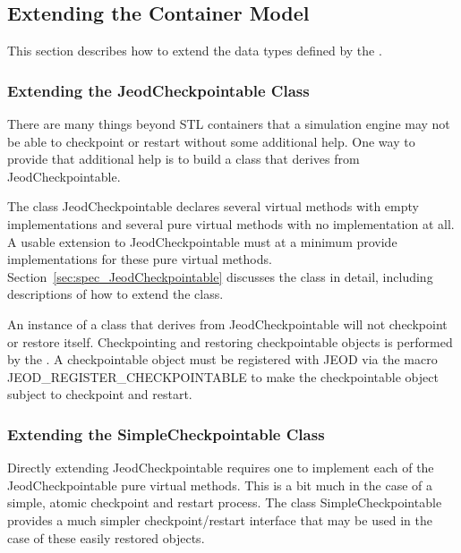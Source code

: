 \subsection{Extending the Container Model}
This section describes how to extend the data types defined by the
\ModelDesc.


\subsubsection{Extending the JeodCheckpointable Class}
\label{sec:guide_JeodCheckpointable}
There are many things beyond STL containers that a simulation engine may not
be able to checkpoint or restart without some additional help. One way
to provide that additional help is to build a class that derives from
JeodCheckpointable.

The class JeodCheckpointable declares several virtual methods with empty
implementations and several pure virtual methods with no implementation
at all. A usable extension to JeodCheckpointable must at a minimum
provide implementations for these pure virtual methods.
Section~\ref{sec:spec_JeodCheckpointable} discusses the class in detail,
including descriptions of how to extend the class.

An instance of a class that derives from JeodCheckpointable will not checkpoint
or restore itself. Checkpointing and restoring checkpointable objects is
performed by the \SIMINTERFACE. A checkpointable object must be registered
with JEOD via the macro JEOD\_REGISTER\_CHECKPOINTABLE to make the
checkpointable object subject to checkpoint and restart.


\subsubsection{Extending the SimpleCheckpointable Class}
Directly extending JeodCheckpointable requires one to implement each of
the JeodCheckpointable pure virtual methods. This is a bit much in the
case of a simple, atomic checkpoint and restart process. The class
SimpleCheckpointable provides a much simpler checkpoint/restart interface that
may be used in the case of these easily restored objects.

